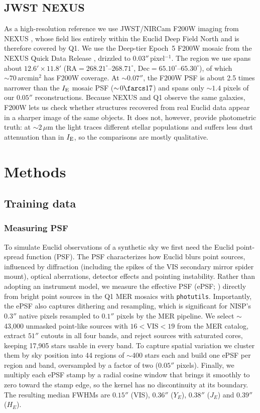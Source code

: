 \documentclass[linenumbers,trackchanges,twocolumn]{aastex701}
\begin{document}
\subsection{JWST NEXUS}\label{sec:data_nexus}
As a high-resolution reference we use JWST/NIRCam F200W imaging from NEXUS
\citep{Shen2024NEXUS}, whose field lies entirely within the Euclid Deep Field North and is therefore covered by Q1. 
We use the Deep-tier Epoch~5 F200W mosaic from the NEXUS Quick Data Release \citep{Zhuang2026NEXUSQDR}, drizzled to $0.03''$\,pixel$^{-1}$. The region we use spans about $12.6'\times11.8'$ ($\mathrm{RA}=268.21^\circ$--$268.71^\circ$, $\mathrm{Dec}=65.10^\circ$--$65.30^\circ$), of which $\sim\!70\,\mathrm{arcmin}^2$ has F200W coverage. 
At $\sim\!0.07''$, the F200W PSF is about 2.5 times narrower than the $I_{\rm E}$ mosaic PSF ($\sim\!0\farcs17$) and spans only $\sim\!1.4$ pixels of our $0.05''$ reconstructions. 
Because NEXUS and Q1 observe the same galaxies, F200W lets us check whether structures recovered from real Euclid data appear in a sharper image of the
same objects. 
It does not, however, provide photometric truth: at $\sim\!2\,\mu$m the
light traces different stellar populations and suffers less dust attenuation than in $I_{\rm E}$, so the comparisons are mostly qualitative.

\section{Methods}
\subsection{Training data}
\subsubsection{Measuring PSF}
To simulate Euclid observations of a synthetic sky we first need the Euclid point-spread function (PSF).
The PSF characterizes how Euclid blurs point sources, influenced by diffraction (including the spikes of the VIS secondary mirror spider mount), optical aberrations, detector effects and pointing instability.
Rather than adopting an instrument model, we measure the effective PSF (ePSF; \citealt{AndersonKing2000}) directly from bright point sources in the Q1 MER mosaics with \texttt{photutils}.
Importantly, the ePSF also captures dithering and resampling, which is significant for NISP's $0.3''$ native pixels resampled to $0.1''$ pixels by the MER pipeline.
We select $\sim$43{,}000 unmasked point-like sources with $16 < \mathrm{VIS} < 19$ from the MER catalog, extract $51''$ cutouts in all four bands, and reject sources with saturated cores, keeping 17{,}905 stars usable in every band.
To capture spatial variation we cluster them by sky position into 44 regions of $\sim$400 stars each and build one ePSF per region and band, oversampled by a factor of two ($0.05''$ pixels).
Finally, we multiply each ePSF stamp by a radial cosine window that brings it smoothly to zero toward the stamp edge, so the kernel has no discontinuity at its boundary.
The resulting median FWHMs are $0.15''$ (VIS), $0.36''$ ($Y_E$), $0.38''$ ($J_E$) and $0.39''$ ($H_E$).
\end{document}
